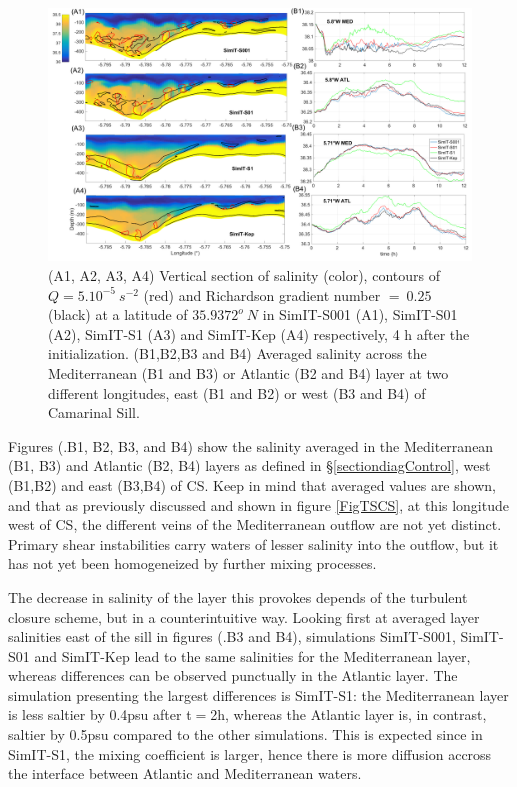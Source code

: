 \begin{figure}[!h]
 \includegraphics[width=\textwidth]{./GBR3D/Figsmago.png}
 \caption [Vertical section of salinity and averaged salinity in atlantic and mediterranean layers.]{ (A1, A2, A3, A4) Vertical section of salinity (color), contours of $Q = 5.10^{-5} \ s^{-2}$ (red) and Richardson gradient number $=\ 0.25$ (black) at a latitude of $35.9372^o\ N$ in SimIT-S001 (A1), SimIT-S01 (A2), SimIT-S1 (A3) and SimIT-Kep (A4) respectively, 4 h after the initialization. (B1,B2,B3 and B4) Averaged salinity across the Mediterranean (B1 and B3) or Atlantic (B2 and B4) layer at two different longitudes, east (B1 and B2) or west (B3 and B4) of Camarinal Sill.}
 \label{Fig3Dsch}
\end{figure}

Figures (.B1, B2, B3, and B4) show the salinity averaged in the Mediterranean (B1, B3) and Atlantic (B2, B4) layers as defined in \S \ref{sectiondiagControl}, west (B1,B2) and east (B3,B4) of CS. Keep in mind that averaged values are shown, and that as previously discussed and shown in figure \ref{FigTSCS}, at this longitude west of CS, the different veins of the Mediterranean outflow are not yet distinct. Primary shear instabilities carry waters of lesser salinity into the outflow, but it has not yet been homogeneized by further mixing processes.

The decrease in salinity of the layer this provokes depends of the turbulent closure scheme, but in a counterintuitive way. Looking first at averaged layer salinities east of the sill in figures (.B3 and B4), simulations SimIT-S001, SimIT-S01 and SimIT-Kep lead to the same salinities for the Mediterranean layer, whereas differences can be observed punctually in the Atlantic layer. The simulation presenting the largest differences is SimIT-S1: the Mediterranean layer is less saltier by 0.4psu after t$=$2h, whereas the Atlantic layer is, in contrast, saltier by 0.5psu compared to the other simulations. This is expected since in SimIT-S1, the mixing coefficient is larger, hence there is more diffusion accross the interface between Atlantic and Mediterranean waters.

